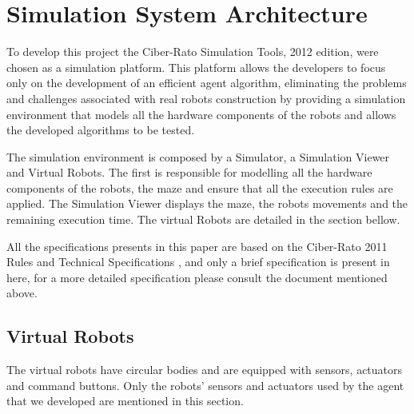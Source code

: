 \documentclass[oribibl]{llncs}
\begin{document}
\section{Simulation System Architecture}
To develop this project the Ciber-Rato Simulation Tools, 2012 edition, were chosen as a simulation platform. This platform allows the developers to focus only on the development of an efficient agent algorithm, eliminating the problems and challenges associated with real robots construction by providing a simulation environment that models all the hardware components of the robots and allows the developed algorithms to be tested\cite{Lau2002}. 

The simulation environment is composed by a Simulator, a Simulation Viewer and Virtual Robots. The first is responsible for modelling all the hardware components of the robots, the maze and ensure that all the execution rules are applied. The Simulation Viewer displays the maze, the robots movements and the remaining execution time. The virtual Robots are detailed in the section bellow.

All the specifications presents in this paper are based on the Ciber-Rato 2011 Rules and Technical Specifications \cite{DepartamentodeElectronica2011}, and only a brief specification is present in here, for a more detailed specification please consult the document mentioned above.

\subsection{Virtual Robots}
The virtual robots have circular bodies and are equipped with sensors, actuators and command buttons. Only the robots' sensors and actuators used by the agent that we developed are mentioned in this section.
\end{document}
